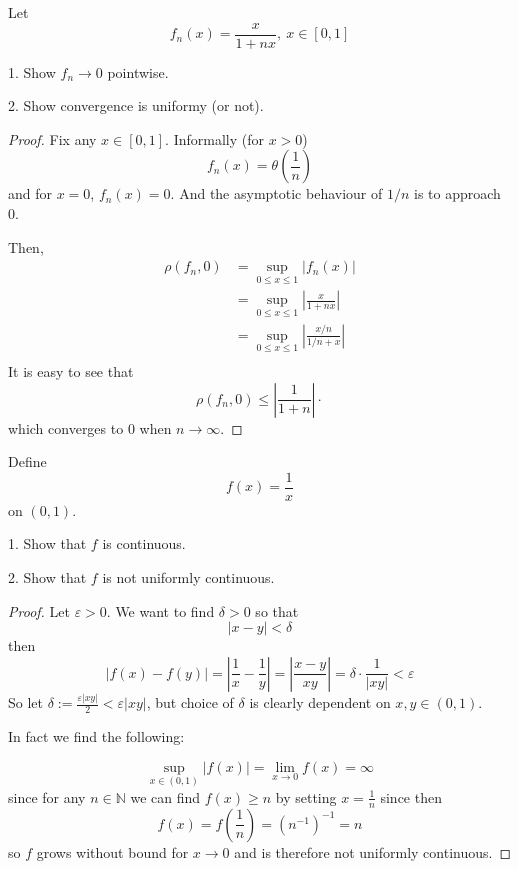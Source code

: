 \begin{prob}
    Let 
    \[
        f_n(x) = \frac{x}{1+nx}, \ x \in [0,1]
    \]

    1. Show $f_n \to 0$ pointwise. 

    2. Show convergence is uniformy (or not).
\end{prob}
\begin{proof}
    Fix any $x \in [0,1]$. Informally (for $x > 0$) 
    \[
        f_n(x) = \theta\left(\frac{1}{n}\right)
    \]
    and for $x = 0$, $f_n(x) = 0$. And the asymptotic behaviour of 
    $1/n$ is to approach $0$. 

    Then, 
    \begin{align*}
        \rho(f_n,0) 
        &= \sup_{0\leq x \leq1} |f_n(x)| \\ 
        &= \sup_{0\leq x \leq 1}\left|\frac{x}{1+nx}\right| \\ 
        &= \sup_{0\leq x \leq 1}\left|\frac{x/n}{1/n +x}\right| \\ 
    \end{align*}
    It is easy to see that 
    \[
        \rho(f_n,0) \leq \left|\frac{1}{1 + n}\right|\cdot 
    \]
    which converges to $0$ when $n \to \infty$.
\end{proof}
\begin{prob}
    Define 
    \[
        f(x) = \frac{1}{x}
    \]
    on $(0,1)$. 

    1. Show that $f$ is continuous. 

    2. Show that $f$ is not uniformly continuous.
\end{prob}
\begin{proof}
    Let $\varepsilon > 0$. We want to find $\delta > 0$ so that
    \[
        |x-y| < \delta 
    \]
    then 
    \[
        |f(x)-f(y)| = \left|\frac{1}{x}-\frac{1}{y}\right| 
        = \left|\frac{x-y}{xy}\right| = 
        \delta \cdot \frac{1}{|xy|} < \varepsilon
    \]
    So let $\delta := \frac{\varepsilon|xy|}{2} < 
    \varepsilon|xy|$, but choice of $\delta$ is clearly 
    dependent on $x,y \in (0,1)$.  
    
    In fact we find the following: 

    \[
        \sup_{x\in(0,1)}|f(x)| = \lim_{x\to 0} f(x) = \infty
    \]
    since for any $n \in \mathbb N$ we can find $f(x) \geq n$ 
    by setting $x = \frac{1}{n}$ since then 
    \[
        f(x) = f\left(\frac{1}{n}\right) = (n^{-1})^{-1} = n
    \]
    so $f$ grows without bound for $x \to 0$ and is therefore 
    not uniformly continuous.

\end{proof}

